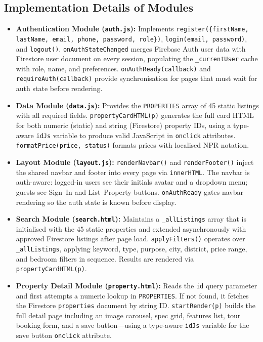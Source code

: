 \documentclass[12pt,a4paper]{report}
\begin{document}
\subsection{Implementation Details of Modules}

\begin{itemize}[leftmargin=2.5em]
  \item \textbf{Authentication Module (\texttt{auth.js}):}
    Implements \texttt{register(\{firstName, lastName, email, phone, password,
    role\})}, \texttt{login(email, password)}, and \texttt{logout()}.
    \texttt{onAuthStateChanged} merges Firebase Auth user data with Firestore
    user document on every session, populating the \texttt{\_currentUser} cache
    with role, name, and preferences. \texttt{onAuthReady(callback)} and
    \texttt{requireAuth(callback)} provide synchronisation for pages that must
    wait for auth state before rendering.

  \item \textbf{Data Module (\texttt{data.js}):}
    Provides the \texttt{PROPERTIES} array of 45 static listings with all
    required fields. \texttt{propertyCardHTML(p)} generates the full card HTML
    for both numeric (static) and string (Firestore) property IDs, using a
    type-aware \texttt{idJs} variable to produce valid JavaScript in
    \texttt{onclick} attributes. \texttt{formatPrice(price, status)} formats
    prices with localised NPR notation.

  \item \textbf{Layout Module (\texttt{layout.js}):}
    \texttt{renderNavbar()} and \texttt{renderFooter()} inject the shared navbar
    and footer into every page via \texttt{innerHTML}. The navbar is auth-aware:
    logged-in users see their initials avatar and a dropdown menu; guests see
    Sign~In and List~Property buttons. \texttt{onAuthReady} gates navbar
    rendering so the auth state is known before display.

  \item \textbf{Search Module (\texttt{search.html}):}
    Maintains a \texttt{\_allListings} array that is initialised with the 45
    static properties and extended asynchronously with approved Firestore listings
    after page load. \texttt{applyFilters()} operates over \texttt{\_allListings},
    applying keyword, type, purpose, city, district, price range, and bedroom
    filters in sequence. Results are rendered via \texttt{propertyCardHTML(p)}.

  \item \textbf{Property Detail Module (\texttt{property.html}):}
    Reads the \texttt{id} query parameter and first attempts a numeric lookup
    in \texttt{PROPERTIES}. If not found, it fetches the Firestore
    \texttt{properties} document by string ID. \texttt{startRender(p)} builds
    the full detail page including an image carousel, spec grid, features list,
    tour booking form, and a save button---using a type-aware \texttt{idJs}
    variable for the save button \texttt{onclick} attribute.


\end{itemize}
\end{document}
